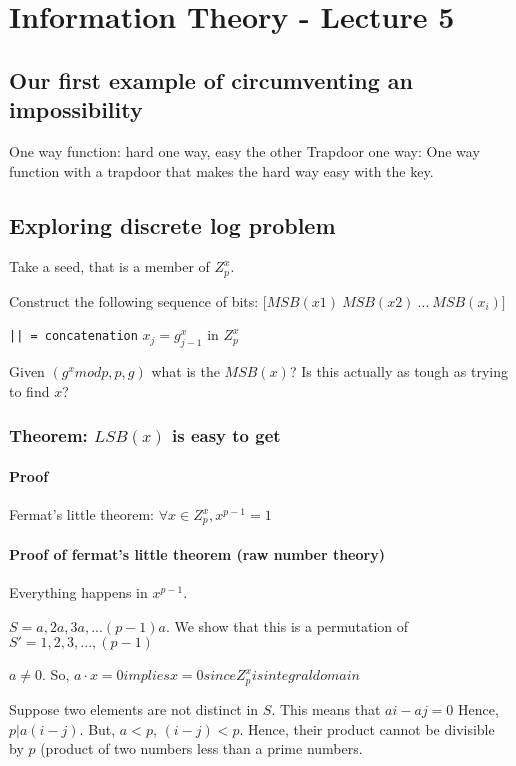 \chapter{Information Theory - Lecture 5}
\section{Our first example of circumventing an impossibility}

One way function: hard one way, easy the other
Trapdoor one way: One way function with a trapdoor that makes the hard way easy with the key.

\section{Exploring discrete log problem}

Take a seed, that is a member of $Z_p^x$.

Construct the following sequence of bits: 
$\lbrack MSB (x1)~MSB (x2) ~\dots~MSB(x_i) \rbrack$

\texttt{|| = concatenation}
$x_j =  g^x_{j - 1}$ in $Z_p^x$


Given $(g^x mod p, p, g)$ what is the $MSB(x)$? Is this actually as tough
as trying to find $x$?


\subsection{Theorem: $LSB(x)$ is easy to get}
\subsubsection{Proof}


Fermat's little theorem: $\forall x \in Z_p^x, x^{p - 1} = 1$
\subsubsection{Proof of fermat's little theorem (raw number theory)}
Everything happens in $x^{p - 1}$.

$S = {a, 2a, 3a, ... (p - 1)a}$.
We show that this is a permutation of
$S' = {1, 2, 3, ..., (p - 1) }$

$a \neq 0$. So, $a \cdot x = 0 implies x = 0 since Z_p^x is integral domain$

Suppose two elements are not distinct in $S$. This means that $ai - aj = 0$
Hence, $p | a(i - j)$. But, $a < p$, $(i - j) < p$. Hence, their product 
cannot be divisible by $p$ (product of two numbers less than a prime numbers.


